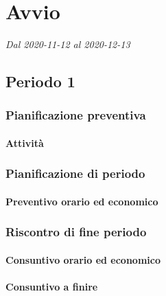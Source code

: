 \section{Avvio}
\textit{Dal 2020-11-12 al 2020-12-13}



\subsection{Periodo 1}

\subsubsection{Pianificazione preventiva}

\paragraph{Attività}


\subsubsection{Pianificazione di periodo}



\paragraph{Preventivo orario ed economico}



\subsubsection{Riscontro di fine periodo}


\paragraph{Consuntivo orario ed economico}


\paragraph{Consuntivo a finire}












\contabilitaTable{

	
}


\planningTable{
	
}